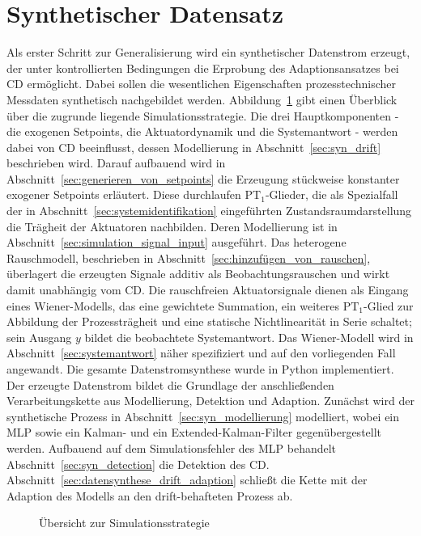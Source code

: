 \section{Synthetischer Datensatz} \label{sec:synthetischer_datensatz}
%

%
Als erster Schritt zur Generalisierung wird ein synthetischer Datenstrom erzeugt, der unter kontrollierten Bedingungen die Erprobung des Adaptionsansatzes bei \ac{CD} ermöglicht. Dabei sollen die wesentlichen Eigenschaften prozesstechnischer Messdaten synthetisch nachgebildet werden. 
Abbildung~\ref{fig:datenstromsynthese} gibt einen Überblick über die zugrunde liegende Simulationsstrategie. Die drei Hauptkomponenten - die exogenen Setpoints, die Aktuatordynamik und die Systemantwort - werden dabei von \ac{CD} beeinflusst, dessen Modellierung in Abschnitt~\ref{sec:syn_drift} beschrieben wird. Darauf aufbauend wird in Abschnitt~\ref{sec:generieren_von_setpoints} die Erzeugung stückweise konstanter exogener Setpoints erläutert. Diese durchlaufen $\mathrm{PT}_1$-Glieder, die als Spezialfall der in Abschnitt~\ref{sec:systemidentifikation} eingeführten Zustandsraumdarstellung die Trägheit der Aktuatoren nachbilden. Deren Modellierung ist in Abschnitt~\ref{sec:simulation_signal_input} ausgeführt. Das heterogene Rauschmodell, beschrieben in Abschnitt~\ref{sec:hinzufügen_von_rauschen}, überlagert die erzeugten Signale additiv als Beobachtungsrauschen und wirkt damit unabhängig vom \ac{CD}. Die rauschfreien Aktuatorsignale dienen als Eingang eines Wiener-Modells, das eine gewichtete Summation, ein weiteres $\mathrm{PT}_1$-Glied zur Abbildung der Prozessträgheit und eine statische Nichtlinearität in Serie schaltet; sein Ausgang $y$ bildet die beobachtete Systemantwort. Das Wiener-Modell wird in Abschnitt~\ref{sec:systemantwort} näher spezifiziert und auf den vorliegenden Fall angewandt. Die gesamte Datenstromsynthese wurde in Python implementiert.
Der erzeugte Datenstrom bildet die Grundlage der anschließenden Verarbeitungskette aus Modellierung, Detektion und Adaption. Zunächst wird der synthetische Prozess in Abschnitt~\ref{sec:syn_modellierung} modelliert, wobei ein \ac{MLP} sowie ein Kalman- und ein Extended-Kalman-Filter gegenübergestellt werden. Aufbauend auf dem Simulationsfehler des \ac{MLP} behandelt Abschnitt~\ref{sec:syn_detection} die Detektion des \ac{CD}. Abschnitt~\ref{sec:datensynthese_drift_adaption} schließt die Kette mit der Adaption des Modells an den drift-behafteten Prozess ab.
%
\begin{figure}[bt!]
    \centering
    
    \caption{Übersicht zur Simulationsstrategie}
    \label{fig:datenstromsynthese}
\end{figure}
%
